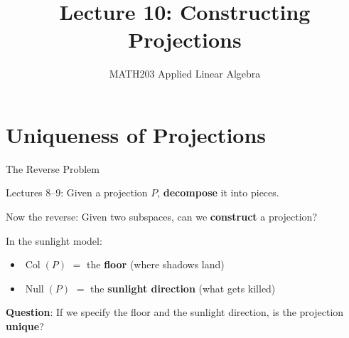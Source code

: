 \documentclass[10pt]{beamer}
\title{Lecture 10: Constructing Projections}
\subtitle{MATH203 Applied Linear Algebra}
\date{}
\theoremstyle{definition}
\newcommand{\x}[1]{\alert{\textbf{#1}}}
\begin{document}
\maketitle


\section{Uniqueness of Projections}


\begin{frame}{The Reverse Problem}

Lectures 8--9: Given a projection $P$, \x{decompose} it into pieces.

\vspace{0.5em}

Now the reverse: Given two subspaces, can we \x{construct} a projection?

\vspace{0.5em}

In the sunlight model:
\begin{itemize}
\item $\operatorname{Col}(P)$ $=$ the \x{floor} (where shadows land)
\item $\operatorname{Null}(P)$ $=$ the \x{sunlight direction} (what gets killed)
\end{itemize}

\vspace{0.5em}

\x{Question}: If we specify the floor and the sunlight direction, is the projection \x{unique}?

\end{frame}
\end{document}
